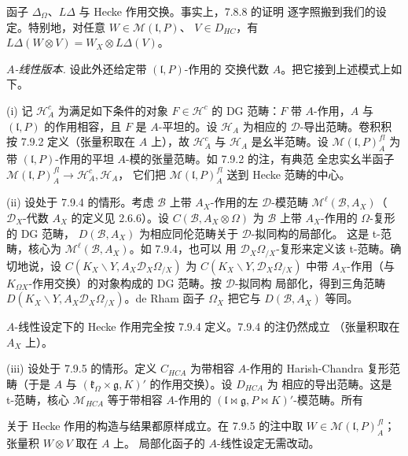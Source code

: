 函子 $\Delta_{\Omega}$、$L\Delta$ 与 Hecke 作用交换。事实上，7.8.8 的证明
逐字照搬到我们的设定。特别地，对任意 $W\in\mathcal{M}(\mathfrak{l},P)$、
$V\in D_{HC}$，有 $L\Delta(W\otimes V)=W_{X}\otimes L\Delta(V)$。


 \emph{$A$-线性版本.} 设此外还给定带 $(\mathfrak{l},P)$-作用的
交换代数 $A$。把它接到上述模式上如下。

(i) 记 $\mathcal{H}^{c}_{A}$ 为满足如下条件的对象 $F\in\mathcal{H}^{c}$ 的
DG 范畴：$F$ 带 $A$-作用，$A$ 与 $(\mathfrak{l},P)$ 的作用相容，且 $F$ 是
$A$-平坦的。设 $\mathcal{H}_{A}$ 为相应的 $\mathcal{D}$-导出范畴。卷积积按
7.9.2 定义（张量积取在 $A$ 上），故 $\mathcal{H}^{c}_{A}$ 与
$\mathcal{H}_{A}$ 是幺半范畴。设 $\mathcal{M}(\mathfrak{l},P)^{fl}_{A}$ 为
带 $(\mathfrak{l},P)$-作用的平坦 $A$-模的张量范畴。如 7.9.2 的注，有典范
全忠实幺半函子
$\mathcal{M}(\mathfrak{l},P)^{fl}_{A}\longrightarrow\mathcal{H}^{c}_{A},\mathcal{H}_{A}$，
它们把 $\mathcal{M}(\mathfrak{l},P)^{fl}_{A}$ 送到 Hecke 范畴的中心。

(ii) 设处于 7.9.4 的情形。考虑 $\mathcal{B}$ 上带 $A_{X}$-作用的左
$\mathcal{D}$-模范畴 $\mathcal{M}^{\ell}(\mathcal{B},A_{X})$（$\mathcal{D}_{X}$-代数
$A_{X}$ 的定义见 2.6.6）。设 $C(\mathcal{B},A_{X}\otimes\Omega)$ 为
$\mathcal{B}$ 上带 $A_{X}$-作用的 $\Omega$-复形的 DG 范畴，
$D(\mathcal{B},A_{X})$ 为相应同伦范畴关于 $\mathcal{D}$-拟同构的局部化。
这是 t-范畴，核心为 $\mathcal{M}^{\ell}(\mathcal{B},A_{X})$。如 7.9.4，也可以
用 $\mathcal{D}_{X}\Omega_{/X}$-复形来定义该 t-范畴。确切地说，设
$C(K_{X}\backslash Y,A_{X}\mathcal{D}_{X}\Omega_{/X})$ 为
$C(K_{X}\backslash Y,\mathcal{D}_{X}\Omega_{/X})$ 中带 $A_{X}$-作用（与
$K_{\Omega X}$-作用交换）的对象构成的 DG 范畴。按 $\mathcal{D}$-拟同构
局部化，得到三角范畴
$D(K_{X}\backslash Y,A_{X}\mathcal{D}_{X}\Omega_{/X})$。de Rham 函子
$\Omega_{X}$ 把它与 $D(\mathcal{B},A_{X})$ 等同。

$A$-线性设定下的 Hecke 作用完全按 7.9.4 定义。7.9.4 的注仍然成立
（张量积取在 $A_{X}$ 上）。

(iii) 设处于 7.9.5 的情形。定义 $C_{HCA}$ 为带相容 $A$-作用的
Harish-Chandra 复形范畴（于是 $A$ 与
$(\mathfrak{k}_{\Omega}\times\mathfrak{g},K)'$ 的作用交换）。设 $D_{HCA}$ 为
相应的导出范畴。这是 t-范畴，核心 $\mathcal{M}_{HCA}$ 等于带相容 $A$-作用的
$(\mathfrak{l}\bowtie\mathfrak{g},P\bowtie K)'$-模范畴。所有


关于 Hecke 作用的构造与结果都原样成立。在 7.9.5 的注中取
$W\in\mathcal{M}(\mathfrak{l},P)^{fl}_{A}$；张量积 $W\otimes V$ 取在 $A$ 上。
局部化函子的 $A$-线性设定无需改动。


